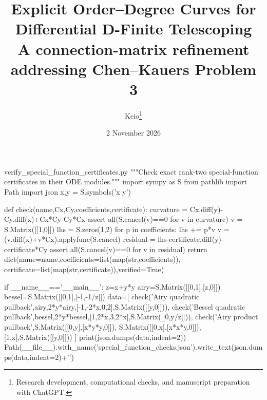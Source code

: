 \begin{filecontents*}[overwrite]{verify_special_function_certificates.py}
"""Check exact rank-two special-function certificates in their ODE modules."""
import sympy as S
from pathlib import Path
import json
x,y = S.symbols('x y')

def check(name,Cx,Cy,coefficients,certificate):
    curvature = Cx.diff(y)-Cy.diff(x)+Cx*Cy-Cy*Cx
    assert all(S.cancel(v)==0 for v in curvature)
    v = S.Matrix([[1,0]])
    lhs = S.zeros(1,2)
    for p in coefficients:
        lhs += p*v
        v = (v.diff(x)+v*Cx).applyfunc(S.cancel)
    residual = lhs-certificate.diff(y)-certificate*Cy
    assert all(S.cancel(v)==0 for v in residual)
    return dict(name=name,coefficients=list(map(str,coefficients)),
                certificate=list(map(str,certificate)),verified=True)

if __name__=='__main__':
    z=x+y*y
    airy=S.Matrix([[0,1],[z,0]])
    bessel=S.Matrix([[0,1],[-1,-1/z]])
    data=[
        check('Airy quadratic pullback',airy,2*y*airy,[-1,-2*x,0,2],S.Matrix([[y,0]])),
        check('Bessel quadratic pullback',bessel,2*y*bessel,[1,2*x,3,2*x],S.Matrix([[0,y/z]])),
        check('Airy product pullback',S.Matrix([[0,y],[x*y*y,0]]),
              S.Matrix([[0,x],[x*x*y,0]]),[1,x],S.Matrix([[y,0]]))
    ]
    print(json.dumps(data,indent=2))
    Path(__file__).with_name('special_function_checks.json').write_text(json.dumps(data,indent=2)+'\n')
\end{filecontents*}
\documentclass[11pt,a4paper]{article}
\usepackage[margin=25mm]{geometry}
\usepackage[T1]{fontenc}
\usepackage{lmodern,amsmath,amssymb,amsthm,mathtools,booktabs,array}
\usepackage{xcolor,microtype,fancyhdr}
\usepackage[colorlinks=true,linkcolor=blue!45!black,urlcolor=blue!45!black,citecolor=blue!45!black]{hyperref}
\newtheorem{theorem}{Theorem}[section]
\newtheorem{lemma}[theorem]{Lemma}
\newtheorem{proposition}[theorem]{Proposition}
\newtheorem{corollary}[theorem]{Corollary}
\theoremstyle{remark}\newtheorem{remark}[theorem]{Remark}
\setlength{\emergencystretch}{3em}
\setlength{\headheight}{14pt}
\pagestyle{fancy}\fancyhf{}
\fancyfoot[C]{\thepage}
\title{Explicit Order--Degree Curves for\\Differential D-Finite Telescoping\\[5pt]
\large A connection-matrix refinement addressing Chen--Kauers Problem 3}
\author{Keio\thanks{Research development, computational checks, and manuscript preparation with ChatGPT.}}
\date{2 November 2026}

